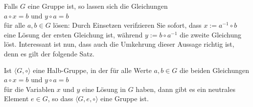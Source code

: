 \noindent
Falls $G$ eine Gruppe ist, so lassen sich die Gleichungen
\\[0.2cm]
\hspace*{1.3cm}
$a \circ x = b$ \quad und \quad $y \circ a = b$
\\[0.2cm]
f\"{u}r alle $a,b \in G$ l\"{o}sen: Durch Einsetzen verifzieren Sie sofort, dass $x := a^{-1} \circ b$
eine L\"{o}sung der ersten Gleichung ist, w\"{a}hrend $y := b \circ a^{-1}$ die zweite Gleichung l\"{o}st.
Interessant ist nun, dass auch die Umkehrung dieser Aussage richtig ist, denn es gilt der folgende
Satz. 

\begin{Satz} \label{satz:solvable}
Ist $\langle G, \circ \rangle$ eine Halb-Gruppe, in der f\"{u}r alle Werte $a,b \in G$ die beiden Gleichungen 
\\[0.2cm]
\hspace*{1.3cm}
$a \circ x = b$ \quad und \quad $y \circ a = b$
\\[0.2cm]  
f\"{u}r die Variablen $x$ und $y$ eine L\"{o}sung in $G$ haben, dann
gibt es ein neutrales Element $e \in G$, so 
dass $\langle G, e, \circ \rangle$  eine Gruppe ist.
\end{Satz}

